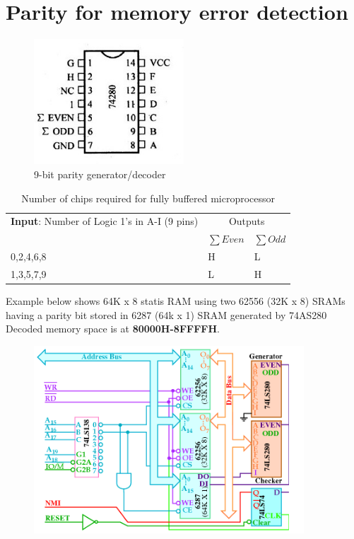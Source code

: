 \section{Parity for memory error detection}

\begin{figure}[h!]
  \includegraphics[width = 0.5\textwidth]{./figures/74LS280.jpeg}
  \caption{9-bit parity generator/decoder}
  \label{}
\end{figure}
\begin{table}[h!]
\centering
\begin{tabular}{ |p{6cm}|p{2cm}|p{2cm}| }
\hline
\textbf{Input}: Number of Logic 1's in A-I (9 pins)& \multicolumn{2}{|c|}{Outputs}\\

& $\sum Even$ & $\sum Odd$ \\
\hline
0,2,4,6,8   & H & L\\
1,3,5,7,9   & L & H\\
\hline
\end{tabular}

\caption{Number of chips required for fully buffered microprocessor}
\label{table:8}
\end{table}
\newpage
Example below shows 64K x 8 statis RAM using two 62556 (32K x 8) SRAMs having a parity bit stored in 6287 (64k x 1) SRAM generated by 74AS280
\newline
Decoded memory space is at \textbf{80000H-8FFFFH}.
\begin{figure}[h!]
  \includegraphics[width = 0.9\textwidth]{./figures/Parity.png}
  \label{fig:parity}
\end{figure}
